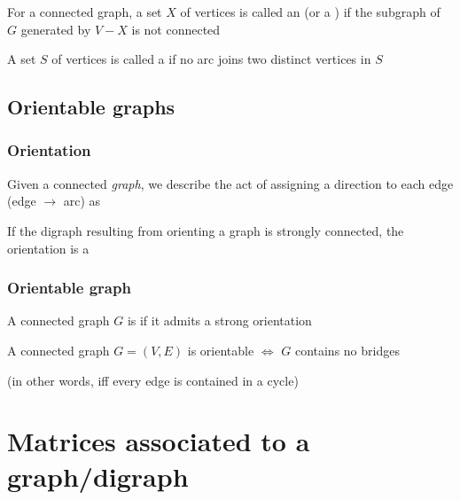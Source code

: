 \documentclass[aspectratio=43]{beamer}
\begin{document}
\begin{frame} 
	\begin{definition}
		For a connected graph, a set $X$ of vertices is called an  (or a ) if the subgraph of $G$ generated by $V-X$ is not connected
	\end{definition}
	\vfill
	\begin{definition}
		A set $S$ of vertices is called a  if no arc joins two distinct vertices in $S$
	\end{definition}
	\vfill
\end{frame}




\subsection{Orientable graphs}
\begin{frame}\frametitle{Orientation}
\begin{definition}
Given a connected \emph{graph}, we describe the act of assigning a direction to each edge (edge $\rightarrow$ arc) as 
\end{definition}
\vfill
\begin{definition}
If the digraph resulting from orienting a graph is strongly connected, the orientation is a 
\end{definition}
\end{frame}
 
 
\begin{frame}\frametitle{Orientable graph}
\begin{definition}
A connected graph $G$ is  if it admits a strong orientation
\end{definition}
\vfill
\begin{theorem}
A connected graph $G=(V,E)$ is orientable $\iff$ $G$ contains no bridges
\end{theorem}
(in other words, iff every edge is contained in a cycle)
\end{frame}
 






\section{Matrices associated to a graph/digraph}
\end{document}
